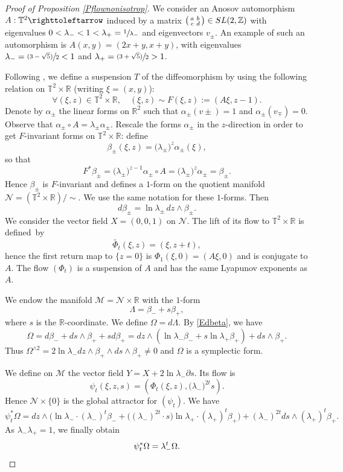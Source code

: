 \documentclass[JEP,XML,SOM,Unicode,published]{cedram}
\newcommand{\psfrac}[2]{\sfrac{(#1)}{#2}}
\newenvironment{smallpmatrix}{\big(\begin{smallmatrix}}{\end{smallmatrix}\big)}
\theoremstyle{definition}
\def\R{\mathbb{R}}
\def\Z{\mathbb{Z}}
\def\T{\mathbb{T}}
\def\cM{{\mathcal M}}
\def\cN{{\mathcal N}}
\begin{document}
\begin{proof}[Proof of Proposition \ref{Pflownonisotrop}]We consider an Anosov automorphism $A: \T^2\righttoleftarrow$ induced by a matrix $\begin{smallpmatrix}
a &b\\
c &d
\end{smallpmatrix} \in SL(2, \Z)$ with eigenvalues $0<\lambda_-< 1 < \lambda_+=\sfrac{1}{\lambda_-}$ and eigenvectors $v_\pm$. An example of such an automorphism is
$A(x,y)=(2x+y, x+y)$, with eigenvalues $\lambda_-=\psfrac{3-\sqrt{5}}{2}<1$ and
$\lambda_+=\psfrac{3+\sqrt{5}}{2}>1$.

Following \cite{ArnoldAvez1967}, we define a suspension $T$ of the diffeomorphism by using the following relation on $\T^2\times \R$ (writing $\xi=(x,y)$):
\[
\forall (\xi,z)\in\T^2\times \R,\quad (\xi,z)\sim F(\xi,z) := (A\xi, z-1).
\]
Denote by $\alpha_\pm$ the linear forms on $\R^2$ such that $\alpha_\pm(v\pm)=1$ and $\alpha_\pm(v_\mp)=0$. Observe that $\alpha_\pm\circ A=\lambda_\pm\alpha_\pm$. Rescale the forms $\alpha_\pm$ in the $z$-direction in order to get $F$\nobreakdash-in\-vari\-ant forms on $\T^2\times \R$: define
\[
\beta_\pm(\xi,z)=\big(\lambda_\pm\big)^z\alpha_\pm(\xi),
\]
so that
\[
F^*\beta_\pm=\big(\lambda_\pm\big)^{z-1}\alpha_\pm\circ A=\big(\lambda_\pm\big)^z\alpha_\pm=\beta_\pm.
\]
Hence $\beta_\pm$ is $F$-invariant and defines a $1$-form on
the quotient manifold \hbox{$\cN\!=\!(\T^2\!\times\!\R)/{\sim}$}. We use the same notation for these $1$-forms. Then
\begin{equation}\label{Edbeta}
d\beta_\pm=\ln\lambda_\pm \, dz\wedge\beta_\pm.
\end{equation}
We consider the vector field $X\!=\!(0, 0, 1)$ on $\cN$. The lift of its flow to $\T^2\!\times\! \R$ is defined~by
\[
\widetilde{\Phi_t}(\xi, z)=(\xi, z+t),
\]
hence the first return map to $\{z=0\}$ is $\Phi_1(\xi, 0)=(A\xi, 0)$ and is conjugate to $A$. The flow $(\Phi_t)$ is a suspension of $A$ and has the same Lyapunov exponents as $A$.

We endow the manifold $\cM=\cN\times\R$ with the $1$-form
\[
\Lambda=\beta_-+s\beta_+,
\]
where $s$ is the $\R$-coordinate. We define
$\Omega=d\Lambda$. By \eqref{Edbeta}, we have
\[
\Omega=d\beta_-+ds\wedge \beta_++sd\beta_+=dz\wedge (\ln\lambda_-\beta_-+s\ln\lambda_+\beta_+)+ds\wedge\beta_+.
\]
Thus $\Omega^{\wedge 2}= 2\ln\lambda_- dz\wedge \beta_+\wedge ds \wedge \beta_+\not=0$ and $\Omega$ is a symplectic form.

We define on $\cM$ the vector field $Y=X+2\ln \lambda_-\partial s$. Its flow is
\[
\psi_t(\xi, z, s)=(\Phi_t(\xi, z), \big(\lambda_-\big)^{2t}s).
\]
Hence $\cN\times \{ 0\}$ is the global attractor for $(\psi_t)$.
We have
\[
\psi_t^*\Omega=dz\wedge\Big(\ln\lambda_-\cdot(\lambda_-)^t\beta_-+\big((\lambda_-)^{2t}\cdot s\big)\ln\lambda_+\cdot(\lambda_+)^t\beta_+\Big)+(\lambda_-)^{2t}ds\wedge(\lambda_+)^t\beta_+.
\]
As $\lambda_-\lambda_+=1$, we finally obtain
\[
\psi_t^*\Omega=\lambda_-^t\Omega.\qedhere
\]
\end{proof}
\end{document}
